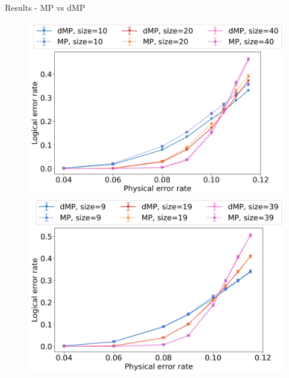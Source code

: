 \documentclass{dfki}
\begin{document}
\begin{frame}{Results - MP vs dMP}
	\begin{figure}[h!]
		\centering
		\begin{minipage}{0.45\textwidth}
			\centering
			\includegraphics[width=\textwidth]{fig/dMP_vs_MP_even.png}
		\end{minipage} \hfill
		\pause
		\begin{minipage}{0.45\textwidth}
			\centering
			\includegraphics[width=\textwidth]{fig/dMP_vs_MP_odd.png}
		\end{minipage}
	\end{figure}
\end{frame}
\end{document}
